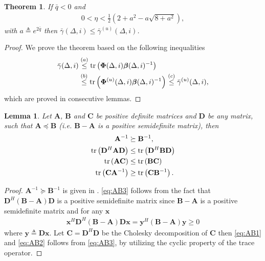 \documentclass[conference, a4paper, 10pt]{IEEEtran}
\newtheorem{thm}{Theorem} %
\newtheorem{lem}{Lemma}
\newcommand{\mx}[1]{\mathbf{#1}}
\newcommand{\bs}[1]{\boldsymbol{#1}}
\begin{document}
\begin{thm}
\label{thm:upperbound}
If $\bar{q}<0$ and
\begin{align}
\label{eq:etacond}
0<\eta<\frac{1}{2}\left(2+a^2-a\sqrt{8+a^2}\right),
\end{align}
with $a\triangleq e^{2\bar{q}}$
then  $\bar{\gamma}(\Delta, i)\leq \bar{\gamma}^{(u)}(\Delta, i)$.
\end{thm}
\begin{proof}
We prove the theorem based on the following inequalities
\begin{align}
\bar{\gamma}(\Delta, i)
&\overset{(a)}{\leq}
\textup{tr}\left( \bs{\Phi}(\Delta, i) \bs{\beta}(\Delta, i)^{-1} \right) \nonumber \\
&\overset{(b)}{\leq}
   \textup{tr}\left( \bs{\Phi}^{(u)}(\Delta, i) \bs{\beta}(\Delta, i)^{-1} \right)
\overset{(c)}{\leq}
   \bar{\gamma}^{(u)}(\Delta, i),  \label{eq:gammabound}
\end{align}
which are proved in consecutive lemmas.
\end{proof}

\begin{lem}
\label{lem:AB}
Let $\mx{A}$, $\mx{B}$ and $\mx{C}$ be positive definite matrices and $\mx{D}$ be any matrix, such that $\mx{A} \preceq \mx{B}$ (i.e. $\mx{B}-\mx{A}$ is a positive semidefinite matrix), then
\begin{align}
\label{eq:ABinv}
\mx{A}^{-1} &\succeq \mx{B}^{-1},
\\
\label{eq:AB3}
\textup{tr}\left( \mx{D}^H \mx{A} \mx{D} \right) &\leq \textup{tr}\left(\mx{D}^H \mx{B} \mx{D} \right) \\
\label{eq:AB1}
\textup{tr}\left( \mx{A} \mx{C} \right) &\leq \textup{tr}\left(\mx{B} \mx{C} \right)
\\
\label{eq:AB2}
\textup{tr}\left( \mx{C} \mx{A}^{-1} \right) &\geq \textup{tr}\left( \mx{C} \mx{B}^{-1} \right).
\end{align}
\end{lem}
\begin{proof}
$\mx{A}^{-1} \succeq \mx{B}^{-1}$ is given in \cite[p. 495, Corollary 7.7.4(a)]{Horn2013}.
\eqref{eq:AB3} follows from the fact that $\mx{D}^H (\mx{B}-\mx{A}) \mx{D}$ is a positive semidefinite matrix since $\mx{B}-\mx{A}$ is a positive semidefinite matrix and
for any $\mx{x}$
\begin{align}
\mx{x}^H \mx{D}^H (\mx{B}-\mx{A}) \mx{D} \mx{x} = \mx{y}^H (\mx{B}-\mx{A}) \mx{y} \geq 0
\end{align}
where $\mx{y} \triangleq \mx{D} \mx{x}$.
Let $\mx{C}=\mx{D}^H \mx{D}$ be the Cholesky decomposition of $\mx{C}$ then
\eqref{eq:AB1} and \eqref{eq:AB2} follows from \eqref{eq:AB3}, by utilizing the cyclic property of the trace operator.
\end{proof}
\end{document}
